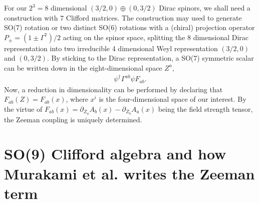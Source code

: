 \documentclass[notitlepage,onecolumn,showpacs,aps,prb]{revtex4-2}
\newcommand{\beq}{\begin{equation}\begin{aligned}}
\newcommand{\eeq}{\end{aligned}\end{equation}}
\begin{document}
For our $2^3=8$ dimensional $(3/2,0)\oplus (0,3/2)$ Dirac spinors, we shall need a construction with 
$7$ Clifford matrices. The construction may used to generate SO(7) rotation or two distinct 
SO(6) rotations with a (chiral) projection operator $P_{\pm}=(1\pm\Gamma^7)/2$ acting 
on the spinor space, splitting the 8 dimensional Dirac 
representation into two irreducible 4 dimensional Weyl representation $(3/2,0)$ and 
$(0,3/2)$. By sticking to the Dirac representation,
a SO(7) symmetric scalar can be written down in the eight-dimensional space $Z^a$,
\beq
\psi^\dagger\Gamma^{ab}\psi F_{ab}.
\eeq
Now, a reduction in dimensionality can be performed by declaring that $F_{ab}(Z)=F_{ab}(x)$,
where $x^i$ is the four-dimensional space of our interest. By the virtue of 
$F_{ab}(x)=\partial_{Z_a}A_b(x)-\partial_{Z_b}A_a(x)$ being the field strength tensor, 
the Zeeman coupling is uniquely determined.

\section{SO(9) Clifford algebra and how Murakami et al. \cite{murakami04} writes the Zeeman term}
\end{document}
